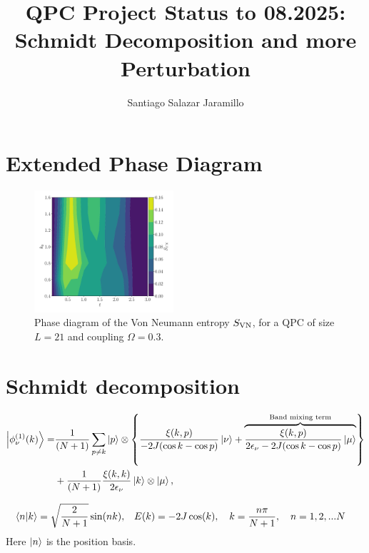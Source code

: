 \documentclass{article}
\title{QPC Project Status to 08.2025: Schmidt Decomposition and more Perturbation}
\author{Santiago Salazar Jaramillo}
\date{}
\begin{document}
\maketitle

\section{Extended Phase Diagram}


\begin{figure}[h]
    \centering
        \includegraphics[width=0.46\textwidth]{figures/report_08_2025/entropy_phase_diagram_L_=21_bw=2.0_Jp=1.0_om=0.3.pdf}
    \caption{Phase diagram of the Von Neumann entropy $S_{\rm{VN}}$, for a QPC of size $L=21$ and coupling $\Omega=0.3$.}
    \label{fig:S_phase_diagram}
\end{figure}


\section{Schmidt decomposition}

\begin{align}\label{eq:psi_1}
    \ket{\phi_\nu^{(1)} (k)} = & \frac{1}{(N+1)}\sum_{p\neq k} \ket{p}\otimes \left \{ \frac{ \xi(k,p)}{ -2J( \cos k - \cos p ) } \ket{\nu} + \overbrace{\frac{ \xi(k,p)}{ 2\epsilon_\nu -2J( \cos k - \cos p )} \ket{\mu}}^{\text{Band mixing term}} \right \} \nonumber \\ 
    & + \frac{1}{(N+1)} \frac{\xi(k,k)}{2\epsilon_\nu} \ket{k}\otimes\ket{\mu},
\end{align}

\begin{tcolorbox}[title=QPC eigenstates, colback=white, colframe=black]
\begin{align}
    \bra{n}\ket{k} = \sqrt{\frac{2}{N+1}} \sin(n k) ,\quad & E(k) = -2J\cos(k), \quad k = \frac{n\pi}{N+1},\quad n= 1, 2,...N
\end{align}
Here $\ket{n}$ is the position basis.
\end{tcolorbox}
\end{document}
